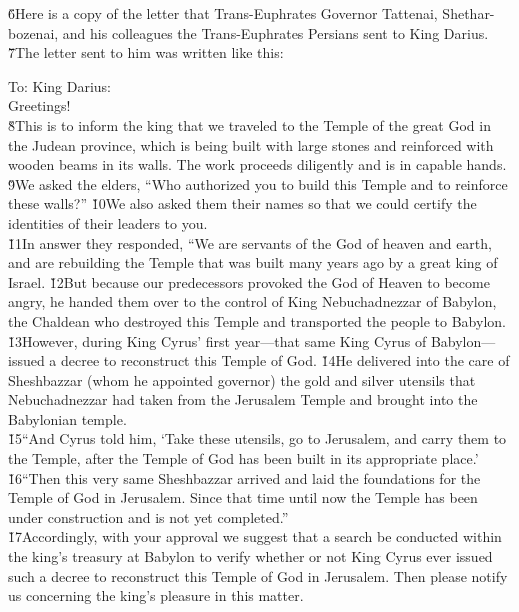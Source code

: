 \v{6}Here is a copy of the letter that Trans-Euphrates Governor Tattenai, Shethar-bozenai, and his colleagues the Trans-Euphrates Persians sent to King Darius. \v{7}The letter sent to him was written like this:

\begin{poetry}
\poeml To: King Darius: \\
\poeml Greetings! \\
\poeml \v{8}This is to inform the king that we traveled to the Temple of the great God in the Judean province, which is being built with large stones and reinforced with wooden beams in its walls. The work proceeds diligently and is in capable hands. \\
\poeml \v{9}We asked the elders, ``Who authorized you to build this Temple and to reinforce these walls?'' \v{10}We also asked them their names so that we could certify the identities of their leaders to you. \\
\poeml \v{11}In answer they responded, ``We are servants of the God of heaven and earth, and are rebuilding the Temple that was built many years ago by a great king of Israel. \v{12}But because our predecessors provoked the God of Heaven to become angry, he handed them over to the control of King Nebuchadnezzar of Babylon, the Chaldean who destroyed this Temple and transported the people to Babylon. \\
\poeml \v{13}However, during King Cyrus' first year---that same King Cyrus of Babylon---issued a decree to reconstruct this Temple of God. \v{14}He delivered into the care of Sheshbazzar (whom he appointed governor) the gold and silver utensils that Nebuchadnezzar had taken from the Jerusalem Temple and brought into the Babylonian temple. \\
\poeml \v{15}``And Cyrus told him, `Take these utensils, go to Jerusalem, and carry them to the Temple, after the Temple of God has been built in its appropriate place.' \\
\poeml \v{16}``Then this very same Sheshbazzar arrived and laid the foundations for the Temple of God in Jerusalem. Since that time until now the Temple has been under construction and is not yet completed.'' \\
\poeml \v{17}Accordingly, with your approval we suggest that a search be conducted within the king's treasury at Babylon to verify whether or not King Cyrus ever issued such a decree to reconstruct this Temple of God in Jerusalem. Then please notify us concerning the king's pleasure in this matter.
\end{poetry}

